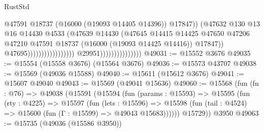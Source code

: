 \begin{lexlean}{RustStd}
\begin{coremodule}
                                                                      @47591
                                                                      @18737
                                                                      (@16000
                                                                        (@19093 @14405 @14396))
                                                                      @17847))
                                                                  (@47632
                                                                    @130
                                                                    @13
                                                                    @16
                                                                    @14430
                                                                    @4533
                                                                    (@47639
                                                                      @14430
                                                                      (@47645
                                                                        @14415
                                                                        @14425
                                                                        @47650
                                                                        @47206
                                                                        @47210
                                                                        @47591
                                                                        @18737
                                                                        (@16000
                                                                          (@19093 @14425 @14416))
                                                                        @17847))
                                                                    @47695)))))))))))))))))
                                  @29951)))))))))))))))
@49031 := @15552 @3676
@49035 := @15554 (@15558 @3676) (@15564 @3676)
@49036 := @15573 @43707
@49038 := @15569 (@49036 @15588)
@49040 := @15611 (@15612 @3676)
@49041 := @15607 @49040
@49043 := @15569 (@49041 @15636)
@49060 := @15568
    (fun (fn : @76) =>
    @49038
      (@15591
        (@15594
          (fun (params : @15593) =>
          @15595
            (fun (rty : @4225) =>
            @15597
              (fun (lets : @15596) =>
              @15598 (fun (tail : @4524) => @15600 (fun (Γ : @15599) => @49043 @15683))))))
        @15729))
    @3950
@49063 := @15735 (@49036 (@15586 @3950))

\end{coremodule}
\end{lexlean}
